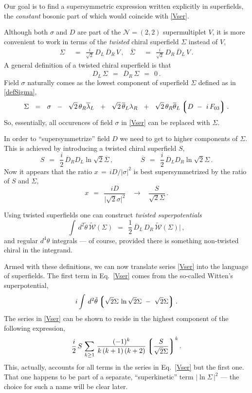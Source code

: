 \documentclass[epsfig,12pt]{article}
\def\beq{\begin{equation}}
\def\eeq{\end{equation}}
\newcommand{\ntwot}{${\mathcal N}= \left(2,2\right) $ }
\newcommand{\cw}{{\mathcal W}}
\newcommand{\wt}{\widetilde}
\newcommand{\ov}{\overline}
\newcommand{\lgr}{\left\lgroup}
\newcommand{\rgr}{\right\rgroup}
\begin{document}
	Our goal is to find a supersymmetric expression written explicitly in superfields,
	the {\it constant} bosonic part of which would coincide with \eqref{Vser}.

	Although both $ \sigma $ and $ D $ are part of the \ntwot supermultiplet $ V $,
	it is more convenient to work in terms of the {\it twisted} chiral superfield $ \Sigma $
	instead of $ V $,
\begin{align}
\label{defSigma}
	\Sigma    & ~~=~~    \frac{i}{\sqrt 2}\, D_L\, \ov D{}_R\, V\,,
	&
	\ov \Sigma    & ~~=~~    \frac{i}{\sqrt 2}\, D_R\, \ov D{}_L\, V\,.
\end{align}
	A general definition of a twisted chiral superfield is that
\beq
	D_L\, \Sigma    ~~=~~    \ov D{}_R\, \Sigma    ~~=~~    0\,.
\eeq
	Field $ \sigma $ naturally comes as the lowest component of superfield $ \Sigma $
	defined as in \eqref{defSigma},
\beq
	\Sigma     ~~=~~    \sigma  ~~-~~  \sqrt{2}\, \theta_R \ov\lambda{}_L
				    ~~+~~  \sqrt{2}\, \ov\theta{}_L \lambda_R
				    ~~+~~  \sqrt{2}\, \theta_R \ov\theta{}_L \lgr D ~-~ i\, F_{03} \rgr.
\eeq
	So, essentially, all occurences of field $ \sigma $ in \eqref{Vser} can be replaced with $ \Sigma $.

	In order to ``supersymmetrize'' field $ D $ we need to get to higher components of $ \Sigma $.
	This is achieved by introducing a twisted chiral superfield $ S $,
\beq
	S    ~~=~~    \frac{i}{2}\,\ov D{}_R D_L \ln \sqrt{2}\ov\Sigma\,,
	\qquad\qquad
	\ov S    ~~=~~    \frac{i}{2}\, \ov D{}_L D_R \ln \sqrt{2}\Sigma\,.
\eeq
	Now it appears that the ratio $ x \,=\, iD/|\sigma|^2 $ is best supersymmetrized \cite{1p} by
	the ratio of $ S $ and $ \Sigma $,
\beq
	x    ~~=~~    \frac{iD}{\big|\sqrt{2}\sigma\big|^2}    ~~~~\longrightarrow~~~~
		\frac{S}{\sqrt{2}\Sigma}\,.
\eeq

	Using twisted superfields one can construct {\it twisted superpotentials}
\beq
	\int\, d^2\tilde\theta\, \wt{\cw}(\Sigma)    ~~=~~    \frac{1}{2}\,\ov D{}_L\, D_R\, \wt{\cw}(\Sigma)\Big|\,,
\eeq
	and regular $ d^4\theta $ integrals --- of course, provided there is something non-twisted chiral
	in the integrand.

	Armed with these definitions, we can now translate series \eqref{Vser} into
	the language of superfields.
	The first term in Eq.~\eqref{Vser} comes from the so-called Witten's superpotential,
\beq
	i \int\, d^2\tilde\theta 
	\lgr
		\sqrt{2}\Sigma\, \ln \sqrt{2}\Sigma  ~-~ \sqrt{2}\Sigma
	\rgr.
\eeq
	The series in \eqref{Vser} can be shown to reside in the highest component of
	the following expression,
\beq
	\frac{i}{2}\, 
	S\,
	\sum_{k \geq 1}\, \frac{    (-1)^k    }
                           {  k\,(k + 1)\,(k + 2)  } \lgr \frac{S}{\sqrt{2}\Sigma} \rgr^k.
\eeq
	This, actually, accounts for all terms in the series in Eq.~\eqref{Vser} but the first one.
	That one happens to be part of a separate, ``superkinetic'' term $ |\ln \Sigma\,|^2 $ ---
	the choice for such a name will be clear later.
\end{document}
